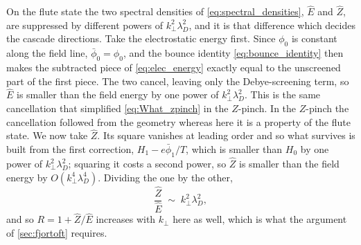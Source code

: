 \documentclass{jpp}
\newcommand{\order}[1]{O\left(#1\right)}
\newcommand{\kperp}{k_\perp}
\newcommand{\lambdaD}{\lambda_D}
\newcommand{\Zhat}{\hat{Z}}
\begin{document}
On the flute state the two spectral densities of \cref{eq:spectral_densities}, $\hat E$ and $\Zhat$, are suppressed by different powers of $\kperp^2\lambdaD^2$, and it is that difference which decides the cascade directions. Take the electrostatic energy first. Since $\phi_0$ is constant along the field line, $\bar\phi_0 = \phi_0$, and the bounce identity \cref{eq:bounce_identity} then makes the subtracted piece of \cref{eq:elec_energy} exactly equal to the unscreened part of the first piece. The two cancel, leaving only the Debye-screening term, so $\hat E$ is smaller than the field energy by one power of $\kperp^2\lambdaD^2$. This is the same cancellation that simplified \cref{eq:What_zpinch} in the $Z$-pinch.  In the $Z$-pinch the cancellation followed from the geometry whereas here it is a property of the flute state. We now take $\Zhat$. Its square vanishes at leading order and so what survives is built from the first correction, $H_1 - e\bar\phi_1/T$, which is smaller than $H_0$ by one power of $\kperp^2\lambdaD^2$; squaring it costs a second power, so $\Zhat$ is smaller than the field energy by $\order{\kperp^4\lambdaD^4}$. Dividing the one by the other,
\begin{equation}\label{eq:Zhat_ratio_general}
\frac{\Zhat}{\hat E} \;\sim\; \kperp^2\lambdaD^2 ,
\end{equation}
and so $R = 1 + \Zhat/\hat E$ increases with $\kperp$ here as well, which is what the argument of \cref{sec:fjortoft} requires.
\end{document}
